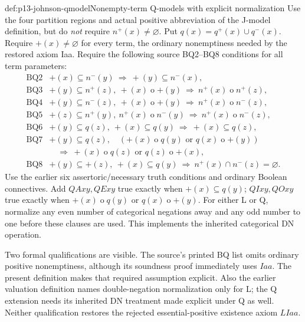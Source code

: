 \begin{hbdefinition}{def:p13-johnson-qmodel}{Nonempty-term Q-models with explicit normalization}
Use the four partition regions and actual positive abbreviation of the
J-model definition, but do \emph{not} require \(n^{+}(x)\ne\varnothing\).
Put \(q(x)=q^{+}(x)\cup q^{-}(x)\). Require \(+(x)\ne\varnothing\)
for every term, the ordinary nonemptiness needed by the restored axiom Iaa.
Require the following source BQ2--BQ8 conditions for all term parameters:
\[
\begin{array}{ll}
\mathrm{BQ2}&+(x)\subseteq n^{-}(y)\ \Longrightarrow\ +(y)\subseteq n^{-}(x),\\
\mathrm{BQ3}&+(y)\subseteq n^{+}(z),\ +(x)\mathbin{o}+(y)
                  \ \Longrightarrow\ n^{+}(x)\mathbin{o}n^{+}(z),\\
\mathrm{BQ4}&+(y)\subseteq n^{-}(z),\ +(x)\mathbin{o}+(y)
                  \ \Longrightarrow\ n^{+}(x)\mathbin{o}n^{-}(z),\\
\mathrm{BQ5}&+(z)\subseteq n^{+}(y),\ n^{+}(x)\mathbin{o}n^{-}(y)
                  \ \Longrightarrow\ n^{+}(x)\mathbin{o}n^{-}(z),\\
\mathrm{BQ6}&+(y)\subseteq q(z),\ +(x)\subseteq q(y)
                  \ \Longrightarrow\ +(x)\subseteq q(z),\\
\mathrm{BQ7}&+(y)\subseteq q(z),\quad
  (+(x)\mathbin{o}q(y)\text{ or }q(x)\mathbin{o}+(y))\\
 &\hspace{1em}\Longrightarrow\ +(x)\mathbin{o}q(z)\text{ or }q(z)\mathbin{o}+(x),\\
\mathrm{BQ8}&+(y)\subseteq +(z),\ +(x)\subseteq q(y)
                  \ \Longrightarrow\ n^{+}(x)\cap n^{-}(z)=\varnothing.
\end{array}
\]
Use the earlier six assertoric/necessary truth conditions and ordinary Boolean
connectives. Add \(QAxy,QExy\) true exactly when \(+(x)\subseteq q(y)\);
\(QIxy,QOxy\) true exactly when \(+(x)\mathbin{o}q(y)\) or
\(q(x)\mathbin{o}+(y)\). For either L or Q, normalize any even number
of categorical negations away and any odd number to one before these
clauses are used. This implements the inherited categorical DN operation.
\end{hbdefinition}

Two formal qualifications are visible. The source's printed BQ list omits
ordinary positive nonemptiness, although its soundness proof immediately uses
\(Iaa\). The present definition makes that required assumption explicit.
Also the earlier valuation definition names double-negation normalization
only for L; the Q extension needs its inherited DN treatment made explicit
under Q as well. Neither qualification restores the rejected essential-positive
existence axiom \(LIaa\).

